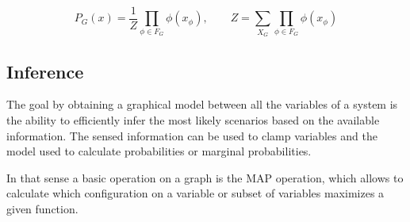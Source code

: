 \begin{equation}
P_G(x) = \frac{1}{Z}\prod_{\phi \in F_G}{\phi(x_{\phi})},\qquad
Z = \sum_{X_G}\prod_{\phi \in F_G}{\phi(x_{\phi})}
\end{equation}

\subsection{Inference}
The goal by obtaining a graphical model between all the variables of a system is the ability
to efficiently infer the most likely scenarios based on the available information.
The sensed information can be used to clamp variables and the model used to calculate probabilities
or marginal probabilities.

In that sense a basic operation on a graph is the \gls{MAP} operation, which allows to calculate
which configuration on a variable or subset of variables maximizes a given function.
